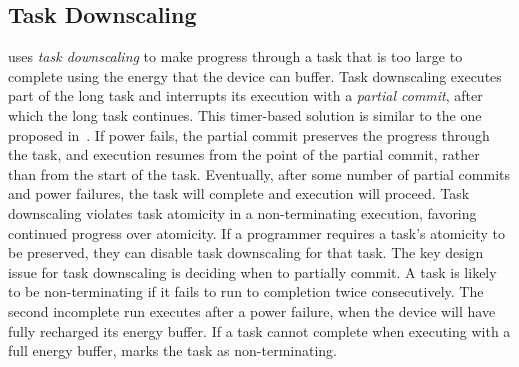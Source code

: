 
\subsection{Task Downscaling}
\label{sec:task_downsizing}

\sys uses {\em task downscaling} to make progress through a task that is too large to complete using the energy that the device can buffer. Task downscaling executes part of the long task and interrupts its execution with a {\em partial commit}, after which the long task continues. This timer-based solution is similar to the one proposed in~\cite{ratchet}. If power fails, the partial commit preserves the progress through the task, and execution resumes from the point of the partial commit, rather than from the start of the task. Eventually, after some number of partial commits and power failures, the task will complete and execution will proceed. Task downscaling violates task atomicity in a non-terminating execution, favoring continued progress over atomicity. If a programmer requires a task's atomicity to be preserved, they can disable task downscaling for that task. The key design issue for task downscaling is deciding when to partially commit. A task is likely to be non-terminating if it fails to run to completion twice consecutively. The second incomplete run executes after a power failure, when the device will have fully recharged its energy buffer. If a task cannot complete when executing with a full energy buffer, \sys marks the task as non-terminating.

